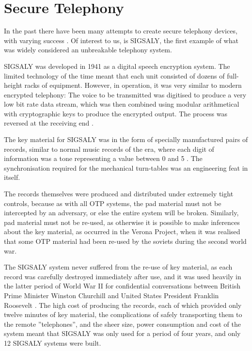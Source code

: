 
\section{Secure Telephony}
\label{chap2sec6}

	In the past there have been many attempts to create secure telephony devices, with varying success \cite{RN30}.
        Of interest to us, is SIGSALY, the first example of what was widely considered an unbreakable telephony system.
        
	SIGSALY was developed in 1941 as a digital speech encryption system.
        The limited technology of the time meant that each unit consisted of dozens of full-height racks of equipment.
        However, in operation, it was very similar to modern encrypted telephony:
        The voice to be transmitted was digitised to produce a very low bit rate data stream, which was then combined using modular arithmetical with cryptographic keys to produce the encrypted output. The process was reversed at the receiving end \cite{bennett1983secret,RN21}.

        The key material for SIGSALY was in the form of specially manufactured pairs of records, similar to normal music records of the era, where each digit of information was a tone representing a value between 0 and 5 \cite{bennett1983secret}.  The synchronisation required for the mechanical turn-tables was an engineering feat in itself.
        
        The records themselves were produced and distributed under extremely tight controls, because as with all OTP systems, the pad material must not be intercepted by an adversary, or else the entire system will be broken.
        Similarly, pad material must not be re-used, as otherwise it is possible to make inferences about the key material, as occurred in the Verona Project, when it was realised that some OTP material had been re-used by the soviets during the second world war\cite{cohen1997venona,mcgrew2002counter}.

        The SIGSALY system never suffered from the re-use of key material, as each record was carefully destroyed immediately after use,
        and it was used heavily in the latter period of World War II for confidential conversations between British Prime Minister Winston Churchill and United States President Franklin Roosevelt \cite{RN21}.
        The high cost of producing the records, each of which provided only twelve minutes of key material, the complications of safely transporting them to the remote ''telephones'', and the sheer size, power consumption and cost of the system meant that SIGSALY was only used for a period of four years, and only 12 SIGSALY systems were built\cite{RN21}.
    
